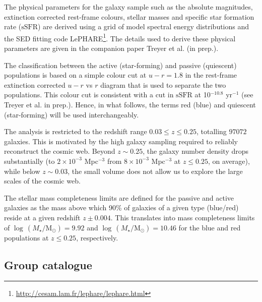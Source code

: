 \documentclass[useAMS,usenatbib]{mnras}
\newcommand{\Mstardot}{M\ensuremath{_{\star}} / \mathrm{M}\ensuremath{_{\odot}}}
\newcommand{\ssfr}{$\mbox{sSFR}$\xspace}
\begin{document}
The physical parameters for the galaxy sample such as the  absolute magnitudes, extinction corrected rest-frame colours, stellar masses and specific star formation rate (\ssfr)
are derived using a grid of model spectral energy distributions \citep[SED;][]{BruzualCharlot2003} and the SED fitting code LePHARE\footnote{\href{http://cesam.lam.fr/lephare/lephare.html}{http://cesam.lam.fr/lephare/lephare.html}}\citep{Arnouts1999,Ilbert2006}. The details  used to derive these physical parameters are given in the companion paper Treyer et al. (in prep.). 

The classification between the active (star-forming) and passive (quiescent) populations is based on a simple colour cut at $u - r = 1.8$ in the rest-frame extinction corrected $u - r$ vs $r$ diagram that %
  is used to separate the two populations. This colour cut is consistent with a cut in \ssfr{} at 10$^{-10.8}$ yr$^{-1}$ (see Treyer et al. in prep.). Hence, in what follows, the terms red (blue) and quiescent (star-forming) will be used interchangeably. 

The analysis is restricted to the redshift range $0.03 \leq z \leq 0.25$, totalling $97072$ galaxies. This is motivated by the high galaxy sampling required to reliably reconstruct %
 the cosmic web. Beyond  $z\sim 0.25$, the galaxy number density drops substantially (to $2 \times 10^{-3}$ Mpc$^{-3}$ from $8 \times 10^{-3}$ Mpc$^{-3}$ at $z \leq 0.25$, on average), while below $z\sim 0.03$, the small volume does not allow us to explore the large scales of the cosmic web.

The stellar mass completeness limits are defined for the passive and active galaxies as the mass above which 90\% of galaxies of a given type (blue/red) reside at a given redshift $z \pm 0.004$.
This translates into mass completeness limits of $\log \, (\Mstardot) = 9.92$ and $\log \, (\Mstardot) = 10.46$ for the blue and red populations at $z \leq 0.25$, respectively. 
 


  
\subsection{Group catalogue}    %
\label{subsec:fof}
\end{document}
